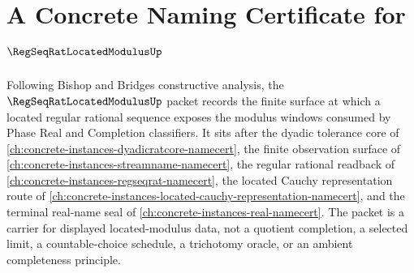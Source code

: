 \chapter{A Concrete Naming Certificate for $\RegSeqRatLocatedModulusUp$}
\label{ch:concrete-instances-regseqrat-located-modulus-namecert}

Following Bishop and Bridges constructive analysis, the $\RegSeqRatLocatedModulusUp$ packet records the finite surface at which a located regular rational sequence exposes the modulus windows consumed by Phase Real and Completion classifiers. It sits after the dyadic tolerance core of \autoref{ch:concrete-instances-dyadicratcore-namecert}, the finite observation surface of \autoref{ch:concrete-instances-streamname-namecert}, the regular rational readback of \autoref{ch:concrete-instances-regseqrat-namecert}, the located Cauchy representation route of \autoref{ch:concrete-instances-located-cauchy-representation-namecert}, and the terminal real-name seal of \autoref{ch:concrete-instances-real-namecert}. The packet is a carrier for displayed located-modulus data, not a quotient completion, a selected limit, a countable-choice schedule, a trichotomy oracle, or an ambient completeness principle.

